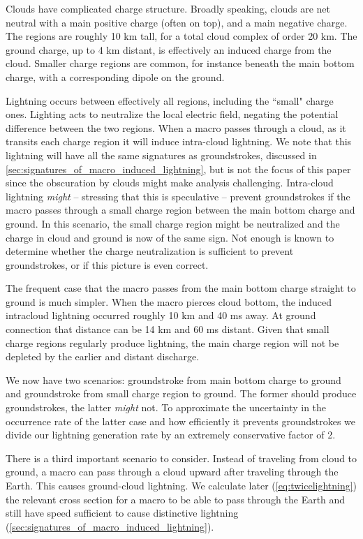 \documentclass[%
 reprint,
 amsmath,amssymb,
 aps,
]{revtex4-2}
\newcommand{\vtwo}[1]{{\color{black} #1}}
\begin{document}
        \vtwo{
        Clouds have complicated charge structure. Broadly speaking, clouds are net neutral with a main positive charge (often on top), and a main negative charge. The regions are roughly 10 km tall, for a total cloud complex of order 20 km. The ground charge, up to 4 km distant, is effectively an induced charge from the cloud. Smaller charge regions are common, for instance beneath the main bottom charge, with a corresponding dipole on the ground.
        
        Lightning occurs between effectively all regions, including the ``small" charge ones. Lighting acts to neutralize the local electric field, negating the potential difference between the two regions. When a macro passes through a cloud, as it transits each charge region it will induce intra-cloud lightning. We note that this lightning will have all the same signatures as groundstrokes, discussed in \ref{sec:signatures_of_macro_induced_lightning}, but is not the focus of this paper since the obscuration by clouds might make analysis challenging. Intra-cloud lightning \textit{might} -- stressing that this is speculative -- prevent groundstrokes if the macro passes through a small charge region between the main bottom charge and ground. In this scenario, the small charge region might be neutralized and the charge in cloud and ground is now of the same sign. Not enough is known to determine whether the charge neutralization is sufficient to prevent groundstrokes, or if this picture is even correct.
        
        The frequent case that the macro passes from the main bottom charge straight to ground is much simpler. When the macro pierces cloud bottom, the induced intracloud lightning occurred roughly 10 km and 40 ms away. At ground connection that distance can be 14 km and 60 ms distant. Given that small charge regions regularly produce lightning, the main charge region will not be depleted by the earlier and distant discharge.

        We now have two scenarios: groundstroke from main bottom charge to ground and groundstroke from small charge region to ground. The former should produce groundstrokes, the latter \textit{might} not. To approximate the uncertainty in the occurrence rate of the latter case and how efficiently it prevents groundstrokes we divide our lightning generation rate by an extremely conservative factor of 2.
        
        There is a third important scenario to consider. Instead of traveling from cloud to ground, a macro can pass through a cloud upward after traveling through the Earth. This causes ground-cloud lightning. We calculate later (\ref{eq:twicelightning}) the relevant cross section for a macro to be able to pass through the Earth and still have speed sufficient to cause distinctive lightning (\ref{sec:signatures_of_macro_induced_lightning}).
        }
\end{document}
